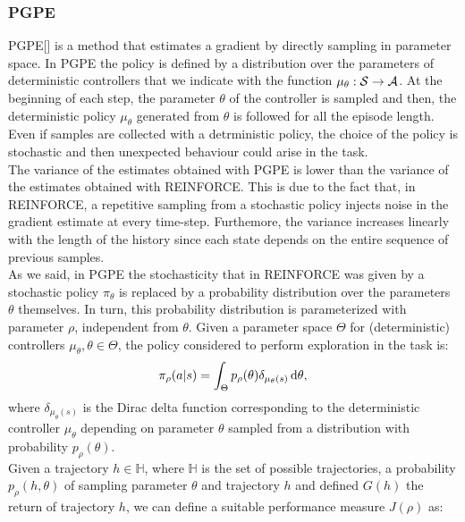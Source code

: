 \subsubsection{PGPE} \label{subsec:pgpe}
\acf{PGPE}[\citet{sehnke2008PolicyGradient}] is a method that estimates a gradient by directly sampling in parameter space. In \ac{PGPE} the policy is defined by a distribution over the parameters of deterministic controllers that we indicate with the function $\mu_{\theta}: \mathcal{S} \to \mathcal{A}$. At the beginning of each step, the parameter $\theta$ of the controller is sampled and then, the deterministic policy $\mu_{\theta}$ generated from $\theta$ is followed for all the episode length. Even if samples are collected with a detrministic policy, the choice of the policy is stochastic and then unexpected behaviour could arise in the task.\\
\newline
The variance of the estimates obtained with \ac{PGPE} is lower than the variance of the estimates obtained with REINFORCE. This is due to the fact that, in REINFORCE, a repetitive sampling from a stochastic policy injects noise in the gradient estimate at every time-step. Furthemore, the variance increases linearly with the length of the history since each state depends on the entire sequence of previous samples.\\
\newline
As we said, in \ac{PGPE} the stochasticity that in REINFORCE was given by a stochastic policy $\pi_{\theta}$ is replaced by a probability distribution over the parameters $\theta$ themselves. In turn, this probability distribution is parameterized with parameter $\rho$, independent from $\theta$. Given a parameter space $\Theta$ for (deterministic) controllers $\mu_{\theta}, \theta \in \Theta$, the policy considered to perform exploration in the task is:
\begin{align}
\pi_{\rho}(a|s) = \int_{\Theta} p_{\rho}(\theta) \delta_{\mu_{\theta}(s)}\,\mathrm{d} \theta,
\end{align}
where $\delta_{\mu_{\theta}(s)}$ is the Dirac delta function corresponding to the deterministic controller $\mu_{\theta}$ depending on parameter $\theta$ sampled from a distribution with probability $p_{\rho}(\theta)$.\\
\newline
Given a trajectory $h \in \mathbb{H}$, where $\mathbb{H}$ is the set of possible trajectories, a probability $p_{\rho}(h, \theta)$ of sampling parameter $\theta$ and trajectory $h$ and defined $G(h)$ the return of trajectory $h$, we can define a suitable performance measure $J(\rho)$ as:
